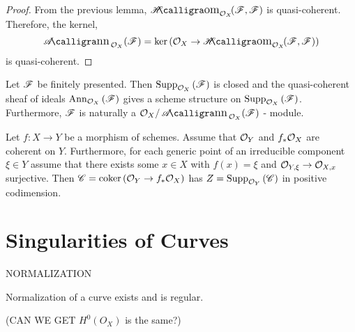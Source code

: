 \documentclass[12pt]{article}
\begin{document}
\begin{proof}
From the previous lemma, $\shHom{\struct{X}}{\F}{\F}$ is quasi-coherent. Therefore, the kernel,
\[ \shAnn{\struct{X}}{\F} = \ker{(\struct{X} \to \shHom{\struct{X}}{\F}{\F})} \]
is quasi-coherent.
\end{proof}

\begin{prop}
Let $\mathscr{F}$ be finitely presented. Then $\mathrm{Supp}_{\mathcal{O}_{X}}\left(\mathscr{F} \right)$ is closed and the quasi-coherent sheaf of ideals $\mathrm{Ann}_{\mathcal{O}_{X}}\left(\mathscr{F}\right)$ gives a scheme structure on $\mathrm{Supp}_{\mathcal{O}_{X}}\left(\mathscr{F} \right)$. Furthermore, $\mathscr{F}$ is naturally a $\struct{X} / \shAnn{\struct{X}}{\F}$ - module.
\end{prop}

\begin{lemma}
Let $f : X \to Y$ be a morphism of schemes. Assume that $\mathcal{O}_{Y}$ and $f_* \mathcal{O}_{X}$ are coherent on $Y$. Furthermore, for each generic point of an irreducible component $\xi \in Y$ assume that there exists some $x \in X$ with $f(x) = \xi$ and $\mathcal{O}_{Y, \xi} \to \mathcal{O}_{X, x}$ surjective. Then $\mathscr{C} = \operatorname{\mathrm{coker}}{(\mathcal{O}_{Y} \to f_* \mathcal{O}_{X})}$ has $Z = \mathrm{Supp}_{\mathcal{O}_{Y}}\left(\mathscr{C} \right)$ in positive codimension.
\end{lemma}


\section{Singularities of Curves}


\begin{defn}
NORMALIZATION
\end{defn}

\begin{prop}
Normalization of a curve exists and is regular. 
\end{prop}

(CAN WE GET $H^0(O_X)$ is the same?)
\end{document}

